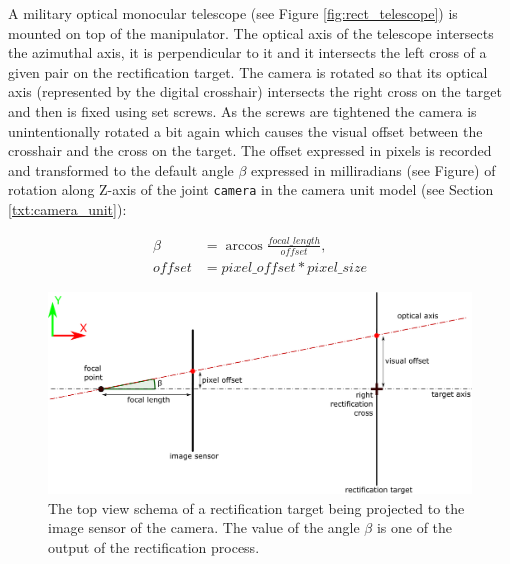 \begin{figure}[htb]
\begin{minipage}{.54\textwidth}
		\label{fig:rect_azi_axis}
	\end{minipage}
\end{figure}

A military optical monocular telescope (see Figure \ref{fig:rect_telescope}) is mounted on top of the manipulator. The optical axis of the telescope intersects the azimuthal axis, it is perpendicular to it and it intersects the left cross of a given pair on the rectification target. The camera is rotated so that its optical axis (represented by the digital crosshair) intersects the right cross on the target and then is fixed using set screws. As the screws are tightened the camera is unintentionally rotated a bit again which causes the visual offset between the crosshair and the cross on the target. The offset expressed in pixels is recorded and transformed to the default angle $\beta$ expressed in milliradians (see Figure) of rotation along Z-axis of the joint \texttt{camera} in the camera unit model (see Section \ref{txt:camera_unit}):

\begin{equation*}
\begin{aligned}
\beta &= \arccos\frac{focal\_length}{offset}, \\
offset &= pixel\_offset * pixel\_size
\end{aligned}
\end{equation*}

\begin{figure}[htb]
	\centering
	\includegraphics[width=13cm]{fig/rect_pixel_offset.pdf}
	\caption{The top view schema of a rectification target being projected to the image sensor of the camera. The value of the angle $\beta$ is one of the output of the rectification process.}
	\label{fig:rect_pixel_offset}
\end{figure}

